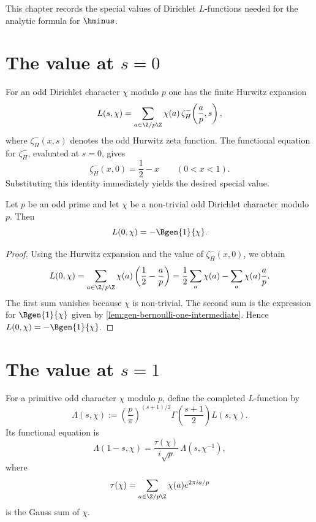 This chapter records the special values of Dirichlet $L$-functions needed for
the analytic formula for $\hminus$.

\section{The value at \texorpdfstring{$s=0$}{s=0}}

For an odd Dirichlet character $\chi$ modulo $p$ one has the finite Hurwitz
expansion
\[
  L(s,\chi)
  = \sum_{a\in \Z/p\Z}\chi(a)\,\zeta_H^{-}\!\left(\frac{a}{p},s\right),
\]
where \(\zeta_H^{-}(x,s)\) denotes the odd Hurwitz zeta function. The
functional equation for \(\zeta_H^{-}\), evaluated at $s=0$, gives
\[
  \zeta_H^{-}(x,0) = \frac12 - x
  \qquad (0<x<1).
\]
Substituting this identity immediately yields the desired special value.

\begin{theorem}
  \label{thm:L0-eq-neg-B1}
  \leanok
Let $p$ be an odd prime and let $\chi$ be a non-trivial odd Dirichlet
character modulo $p$. Then
\[
  L(0,\chi) = -\Bgen{1}{\chi}.
\]
\end{theorem}

\begin{proof}\leanok
Using the Hurwitz expansion and the value of \(\zeta_H^{-}(x,0)\), we obtain
\[
  L(0,\chi)
  = \sum_{a\in \Z/p\Z}\chi(a)\left(\frac12-\frac{a}{p}\right)
  = \frac12\sum_a \chi(a) - \sum_a \chi(a)\frac{a}{p}.
\]
The first sum vanishes because $\chi$ is non-trivial. The second sum is the
expression for $\Bgen{1}{\chi}$ given by
\cref{lem:gen-bernoulli-one-intermediate}. Hence
\(
  L(0,\chi) = -\Bgen{1}{\chi}.
\)
\end{proof}

\section{The value at \texorpdfstring{$s=1$}{s=1}}

For a primitive odd character $\chi$ modulo $p$, define the completed
$L$-function by
\[
  \Lambda(s,\chi)
  := \left(\frac{p}{\pi}\right)^{(s+1)/2}
     \Gamma\!\left(\frac{s+1}{2}\right)L(s,\chi).
\]
Its functional equation is
\[
  \Lambda(1-s,\chi)
  = \frac{\tau(\chi)}{i\sqrt p}\,\Lambda(s,\chi^{-1}),
\]
where
\[
  \tau(\chi)=\sum_{a\in \Z/p\Z}\chi(a)e^{2\pi i a/p}
\]
is the Gauss sum of $\chi$.


